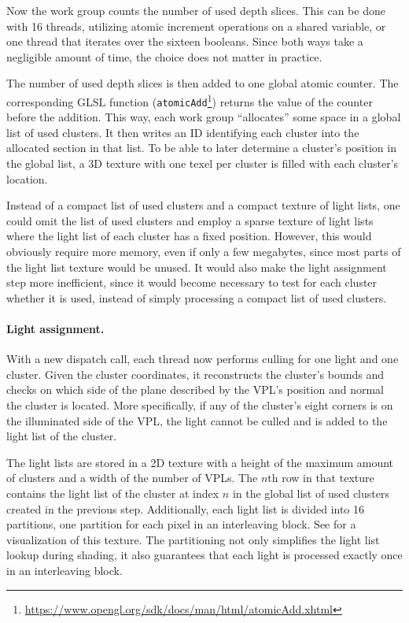 Now the work group counts the number of used depth slices. This can be done with 16 threads, utilizing atomic increment operations on a shared variable, or one thread that iterates over the sixteen booleans. Since both ways take a negligible amount of time, the choice does not matter in practice.

The number of used depth slices is then added to one global atomic counter. The corresponding GLSL function (\texttt{atomicAdd}\footnote{\url{https://www.opengl.org/sdk/docs/man/html/atomicAdd.xhtml}}) returns the value of the counter before the addition. This way, each work group ``allocates'' some space in a global list of used clusters. It then writes an ID identifying each cluster into the allocated section in that list. To be able to later determine a cluster's position in the global list, a 3D texture with one texel per cluster is filled with each cluster's location.

Instead of a compact list of used clusters and a compact texture of light lists, one could omit the list of used clusters and employ a sparse texture of light lists where the light list of each cluster has a fixed position. However, this would obviously require more memory, even if only a few megabytes, since most parts of the light list texture would be unused. It would also make the light assignment step more inefficient, since it would become necessary to test for each cluster whether it is used, instead of simply processing a compact list of used clusters.


\paragraph{Light assignment.}
With a new dispatch call, each thread now performs culling for one light and one cluster. Given the cluster coordinates, it reconstructs the cluster's bounds and checks on which side of the plane described by the VPL's position and normal the cluster is located. More specifically, if any of the cluster's eight corners is on the illuminated side of the VPL, the light cannot be culled and is added to the light list of the cluster.

The light lists are stored in a 2D texture with a height of the maximum amount of clusters and a width of the number of VPLs. The $n$th row in that texture contains the light list of the cluster at index $n$ in the global list of used clusters created in the previous step. Additionally, each light list is divided into 16 partitions, one partition for each pixel in an interleaving block. See  for a visualization of this texture. The partitioning not only simplifies the light list lookup during shading, it also guarantees that each light is processed exactly once in an interleaving block.


